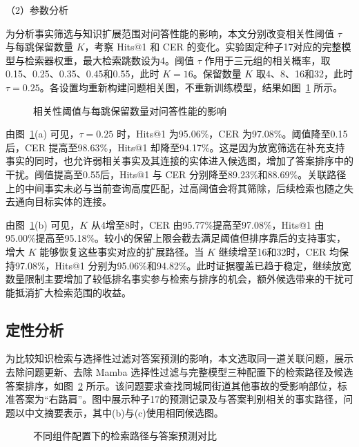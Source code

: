 \noindent（2）参数分析

为分析事实筛选与知识扩展范围对问答性能的影响，本文分别改变相关性阈值 $\tau$ 与每跳保留数量 $K$，考察 Hits@1 和 CER 的变化。实验固定种子17对应的完整模型与检索器权重，最大检索跳数设为4。阈值 $\tau$ 作用于三元组的相关概率，取0.15、0.25、0.35、0.45和0.55，此时 $K=16$。保留数量 $K$ 取4、8、16和32，此时 $\tau=0.25$。各设置均重新构建问题相关图，不重新训练模型，结果如图~\ref{fig:ch2-sensitivity} 所示。

\begin{figure}[htbp]
  \centering
  
  \caption{相关性阈值与每跳保留数量对问答性能的影响}
  \label{fig:ch2-sensitivity}
\end{figure}

由图~\ref{fig:ch2-sensitivity}(a) 可见，$\tau=0.25$ 时，Hits@1 为95.06\%，CER 为97.08\%。阈值降至0.15后，CER 提高至98.63\%，Hits@1 却降至94.17\%。这是因为放宽筛选在补充支持事实的同时，也允许弱相关事实及其连接的实体进入候选图，增加了答案排序中的干扰。阈值提高至0.55后，Hits@1 与 CER 分别降至89.23\%和88.69\%。关联路径上的中间事实未必与当前查询高度匹配，过高阈值会将其筛除，后续检索也随之失去通向目标实体的连接。

由图~\ref{fig:ch2-sensitivity}(b) 可见，$K$ 从4增至8时，CER 由95.77\%提高至97.08\%，Hits@1 由95.00\%提高至95.18\%。较小的保留上限会截去满足阈值但排序靠后的支持事实，增大 $K$ 能够恢复这些事实对应的扩展路径。当 $K$ 继续增至16和32时，CER 均保持97.08\%，Hits@1 分别为95.06\%和94.82\%。此时证据覆盖已趋于稳定，继续放宽数量限制主要增加了较低排名事实参与检索与排序的机会，额外候选带来的干扰可能抵消扩大检索范围的收益。

\subsection{定性分析}

为比较知识检索与选择性过滤对答案预测的影响，本文选取同一道关联问题，展示去除问题更新、去除 Mamba 选择性过滤与完整模型三种配置下的检索路径及候选答案排序，如图~\ref{fig:ch2-cases} 所示。该问题要求查找同城同街道其他事故的受影响部位，标准答案为“右路肩”。图中展示种子17的预测记录及与答案判别相关的事实路径，问题以中文摘要表示，其中(b)与(c)使用相同候选图。

\begin{figure}[htbp]
  \centering
  
  \caption{不同组件配置下的检索路径与答案预测对比}
  \label{fig:ch2-cases}
\end{figure}


